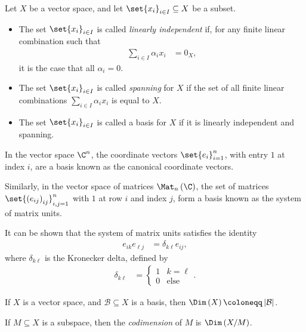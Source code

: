\begin{definition}\label{def:basis}
  Let $X$ be a vector space, and let $\set{x_i}_{i\in I}\subseteq X$ be a subset.
  \begin{itemize}
    \item The set $\set{x_i}_{i\in I}$ is called \textit{linearly independent} if, for any finite linear combination such that
      \begin{align*}
        \sum_{i\in I}\alpha_ix_i &= 0_X,
      \end{align*}
      it is the case that all $\alpha_i = 0$.
    \item The set $\set{x_i}_{i\in I}$ is called \textit{spanning} for $X$ if the set of all finite linear combinations $\sum_{i\in I}\alpha_ix_i$ is equal to $X$.
    \item The set $\set{x_i}_{i\in I}$ is called a basis for $X$ if it is linearly independent and spanning.
  \end{itemize}
\end{definition}
\begin{example}
  In the vector space $\C^n$, the coordinate vectors $\set{e_i}_{i=1}^{n}$, with entry $1$ at index $i$, are a basis known as the canonical coordinate vectors.\newline

  Similarly, in the vector space of matrices $\Mat_n\left( \C \right)$, the set of matrices $\set{\left( e_{ij} \right)_{ij}}_{i,j=1}^{n}$ with $1$ at row $i$ and index $j$, form a basis known as the system of matrix units.
\end{example}
\begin{remark}
  It can be shown that the system of matrix units satisfies the identity
  \begin{align*}
    e_{ik}e_{\ell j} &= \delta_{k\ell}e_{ij},
  \end{align*}
  where $\delta_{k \ell}$ is the Kronecker delta, defined by
  \begin{align*}
    \delta_{k \ell} &= \begin{cases}
      1 & k = \ell\\
      0 & \text{else}
    \end{cases}.
  \end{align*}
\end{remark}
\begin{definition}
  If $X$ is a vector space, and $\mathcal{B}\subseteq X$ is a basis, then $\Dim\left(X\right)\coloneq \left\vert \mathcal{B} \right\vert$.\newline

  If $M\subseteq X$ is a subspace, then the \textit{codimension} of $M$ is $\Dim\left(X/M\right)$.
\end{definition}
